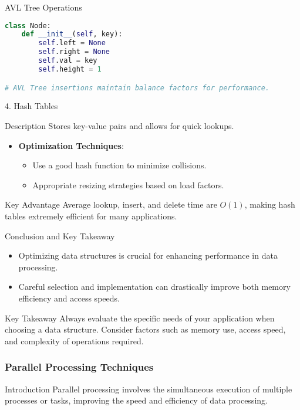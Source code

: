\documentclass[aspectratio=169]{beamer}
\begin{document}
\begin{frame}[fragile]{AVL Tree Operations}
  \begin{lstlisting}[language=Python]
class Node:
    def __init__(self, key):
        self.left = None
        self.right = None
        self.val = key
        self.height = 1

# AVL Tree insertions maintain balance factors for performance.
  \end{lstlisting}
\end{frame}

\begin{frame}{4. Hash Tables}
  \begin{block}{Description}
    Stores key-value pairs and allows for quick lookups.
  \end{block}
  \begin{itemize}
    \item \textbf{Optimization Techniques}:
      \begin{itemize}
        \item Use a good hash function to minimize collisions.
        \item Appropriate resizing strategies based on load factors.
      \end{itemize}
  \end{itemize}
  \begin{block}{Key Advantage}
    Average lookup, insert, and delete time are \(O(1)\), making hash tables extremely efficient for many applications.
  \end{block}
\end{frame}

\begin{frame}{Conclusion and Key Takeaway}
  \begin{itemize}
    \item Optimizing data structures is crucial for enhancing performance in data processing.
    \item Careful selection and implementation can drastically improve both memory efficiency and access speeds.
  \end{itemize}
  \begin{block}{Key Takeaway}
    Always evaluate the specific needs of your application when choosing a data structure. Consider factors such as memory use, access speed, and complexity of operations required.
  \end{block}
\end{frame}

\begin{frame}
    \frametitle{Parallel Processing Techniques}
    \begin{block}{Introduction}
        Parallel processing involves the simultaneous execution of multiple processes or tasks, improving the speed and efficiency of data processing.
    \end{block}
\end{frame}
\end{document}
